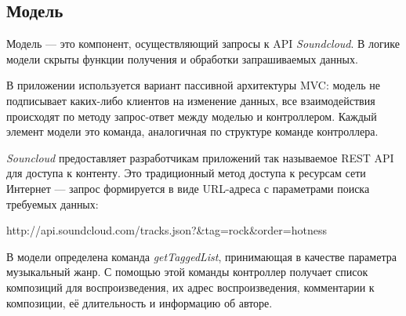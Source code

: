 \subsection{Модель}

Модель --- это компонент, осуществляющий запросы к API
\textit{Soundcloud}. В логике модели скрыты функции получения и
обработки запрашиваемых данных.

В приложении используется вариант пассивной архитектуры MVC: модель не
подписывает каких-либо клиентов на изменение данных, все
взаимодействия происходят по методу запрос-ответ между моделью и
контроллером. Каждый элемент модели это команда, аналогичная по
структуре команде контроллера.  %

\textit{Souncloud} предоставляет разработчикам приложений так
называемое REST API для доступа к контенту. 
Это традиционный метод доступа к ресурсам сети Интернет --- запрос
формируется в виде URL-адреса с параметрами поиска требуемых данных:

\begin{jscode}
  http://api.soundcloud.com/tracks.json?&tag=rock&order=hotness
\end{jscode}

В модели определена команда \textit{getTaggedList}, принимающая в
качестве параметра музыкальный жанр. С помощью этой команды контроллер
получает список композиций для воспроизведения, их адрес
воспроизведения, комментарии к композиции, её длительность и
информацию об авторе.
